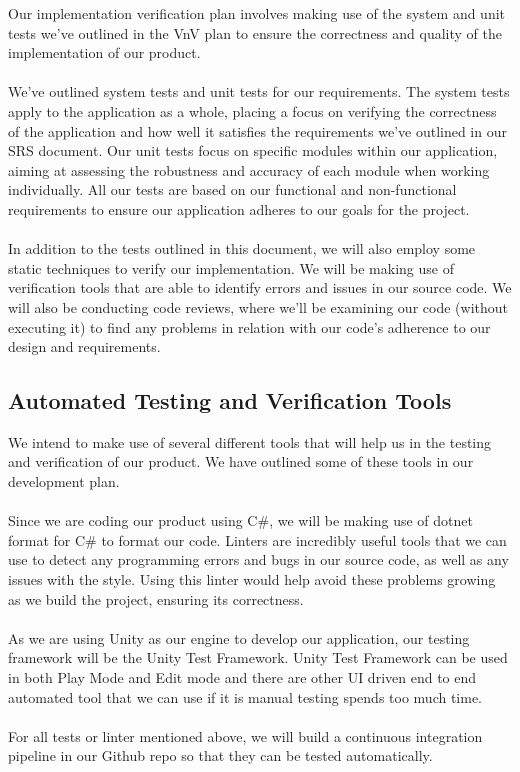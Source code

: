 \documentclass[12pt, titlepage]{article}
\begin{document}
      Our implementation verification plan involves making use of the system and unit tests we've outlined in the VnV plan to ensure the correctness and quality of the implementation of our product.\\\\
      We've outlined system tests and unit tests for our requirements. The system tests apply to the application as a whole, placing a focus on verifying the correctness of the application and how well it satisfies the requirements we've outlined in our SRS document. Our unit tests focus on specific modules within our application, aiming at assessing the robustness and accuracy of each module when working individually. All our tests are based on our functional and non-functional requirements to ensure our application adheres to our goals for the project.\\\\
      In addition to the tests outlined in this document, we will also employ some static techniques to verify our implementation. We will be making use of verification tools that are able to identify errors and issues in our source code. We will also be conducting code reviews, where we'll be examining our code (without executing it) to find any problems in relation with our code's adherence to our design and requirements.

\subsection{Automated Testing and Verification Tools}

      We intend to make use of several different tools that will help us in the testing and verification of our product. We have outlined some of these tools in our development plan.\\\\
      Since we are coding our product using C\#, we will be making use of dotnet format for C\# to format our code. Linters are incredibly useful tools that we can use to detect any programming errors and bugs in our source code, as well as any issues with the style. Using this linter would help avoid these problems growing as we build the project, ensuring its correctness.\\\\
      As we are using Unity as our engine to develop our application, our testing framework will be the Unity Test Framework. Unity Test Framework can be used in both Play Mode and Edit mode and there are other UI driven end to end automated tool that we can use if it is manual testing spends too much time.\\\\
      For all tests or linter mentioned above, we will build a continuous integration pipeline in our Github repo so that they can be tested automatically. 
\end{document}
